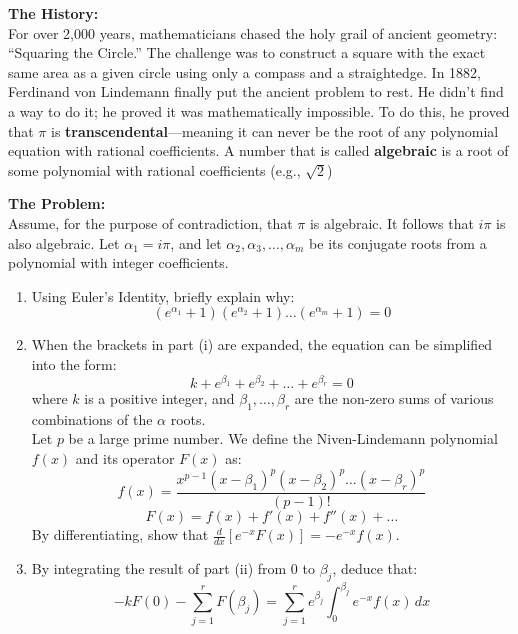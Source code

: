 \begin{problem}

\textbf{The History:} \\
For over 2,000 years, mathematicians chased the holy grail of ancient geometry: ``Squaring the Circle.'' The challenge was to construct a square with the exact same area as a given circle using only a compass and a straightedge. In 1882, Ferdinand von Lindemann finally put the ancient problem to rest. He didn't find a way to do it; he proved it was mathematically impossible. To do this, he proved that $\pi$ is \textbf{transcendental}---meaning it can never be the root of any polynomial equation with rational coefficients. A number that is called \textbf{algebraic} is a root of some polynomial with rational coefficients (e.g., $\sqrt{2}$)

\vspace{0.3cm}
\textbf{The Problem:} \\
Assume, for the purpose of contradiction, that $\pi$ is algebraic. It follows that $i\pi$ is also algebraic. Let $\alpha_1 = i\pi$, and let $\alpha_2, \alpha_3, \dots, \alpha_m$ be its conjugate roots from a polynomial with integer coefficients. 

\begin{enumerate}
    \item[\textbf{(i)}] Using Euler's Identity, briefly explain why:
    \[
    (e^{\alpha_1} + 1)(e^{\alpha_2} + 1) \dots (e^{\alpha_m} + 1) = 0
    \]

    \item[\textbf{(ii)}] When the brackets in part (i) are expanded, the equation can be simplified into the form:
    \[
    k + e^{\beta_1} + e^{\beta_2} + \dots + e^{\beta_r} = 0
    \]
    where $k$ is a positive integer, and $\beta_1, \dots, \beta_r$ are the non-zero sums of various combinations of the $\alpha$ roots. \\
    Let $p$ be a large prime number. We define the Niven-Lindemann polynomial $f(x)$ and its operator $F(x)$ as:
    \[
    f(x) = \frac{x^{p-1}(x-\beta_1)^p(x-\beta_2)^p \dots (x-\beta_r)^p}{(p-1)!}
    \]
    \[
    F(x) = f(x) + f'(x) + f''(x) + \dots
    \]
    By differentiating, show that $\frac{d}{dx} \left[ e^{-x} F(x) \right] = -e^{-x} f(x)$.

    \item[\textbf{(iii)}] By integrating the result of part (ii) from $0$ to $\beta_j$, deduce that:
    \[
    -k F(0) - \sum_{j=1}^r F(\beta_j) = \sum_{j=1}^r e^{\beta_j} \int_0^{\beta_j} e^{-x} f(x) \, dx
    \]


\end{enumerate}
\end{problem}

